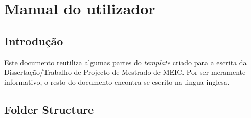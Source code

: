 % 
%  
%
\chapter{Manual do utilizador}
\label{cha:users_manual_test}

\section{Introdução}
\label{sec:introduction}
Este documento reutiliza algumas partes do \textit{template} criado para a escrita da Dissertação/Trabalho de Projecto de Mestrado de MEIC. Por ser meramente informativo, o resto do documento encontra-se escrito na lingua inglesa.

\section{Folder Structure}
\label{sec:folder_structure}

